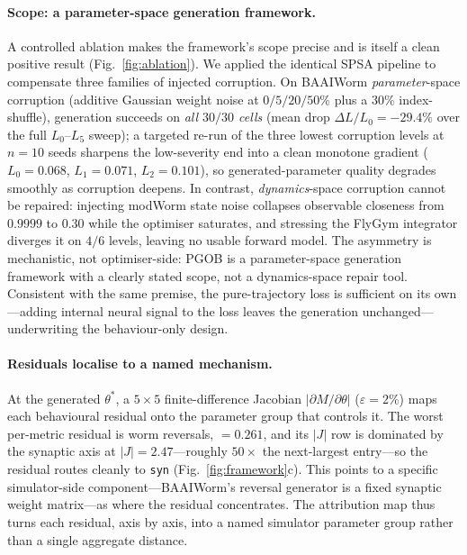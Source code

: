 \documentclass[11pt]{article}
\begin{document}
\paragraph{Scope: a parameter-space generation framework.} A controlled ablation makes the framework's scope precise and is itself a clean positive result (Fig.~\ref{fig:ablation}). We applied the identical SPSA pipeline to compensate three families of injected corruption. On BAAIWorm \emph{parameter}-space corruption (additive Gaussian weight noise at $0/5/20/50\%$ plus a $30\%$ index-shuffle), generation succeeds on \emph{all $30/30$ cells} (mean drop $\Delta L/L_0{=}-29.4\%$ over the full $L_0$--$L_5$ sweep); a targeted re-run of the three lowest corruption levels at $n{=}10$ seeds sharpens the low-severity end into a clean monotone gradient ($L_0{=}0.068$, $L_1{=}0.071$, $L_2{=}0.101$), so generated-parameter quality degrades smoothly as corruption deepens. In contrast, \emph{dynamics}-space corruption cannot be repaired: injecting modWorm state noise collapses observable closeness from $0.9999$ to $0.30$ while the optimiser saturates, and stressing the FlyGym integrator diverges it on $4/6$ levels, leaving no usable forward model. The asymmetry is mechanistic, not optimiser-side: PGOB is a parameter-space generation framework with a clearly stated scope, not a dynamics-space repair tool. Consistent with the same premise, the pure-trajectory loss is sufficient on its own---adding internal neural signal to the loss leaves the generation unchanged---underwriting the behaviour-only design.

\paragraph{Residuals localise to a named mechanism.} At the generated $\theta^{*}$, a $5\times5$ finite-difference Jacobian $|\partial M/\partial\theta|$ ($\varepsilon{=}2\%$) maps each behavioural residual onto the parameter group that controls it. The worst per-metric residual is worm reversals, $=0.261$, and its $|J|$ row is dominated by the synaptic axis at $|J|{=}2.47$---roughly $50\times$ the next-largest entry---so the residual routes cleanly to \texttt{syn} (Fig.~\ref{fig:framework}c). This points to a specific simulator-side component---BAAIWorm's reversal generator is a fixed synaptic weight matrix---as where the residual concentrates. The attribution map thus turns each residual, axis by axis, into a named simulator parameter group rather than a single aggregate distance.
\end{document}
